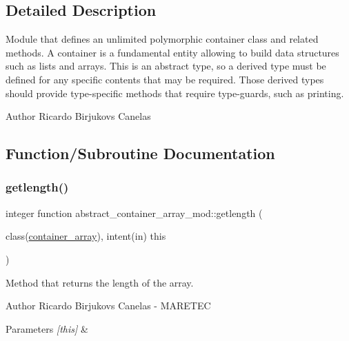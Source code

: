 \subsection{Detailed Description}
Module that defines an unlimited polymorphic container class and related methods. A container is a fundamental entity allowing to build data structures such as lists and arrays. This is an abstract type, so a derived type must be defined for any specific contents that may be required. Those derived types should provide type-\/specific methods that require type-\/guards, such as printing. 

\begin{DoxyAuthor}{Author}
Ricardo Birjukovs Canelas 
\end{DoxyAuthor}


\subsection{Function/\+Subroutine Documentation}
\mbox{\label{namespaceabstract__container__array__mod_a22d71ca3f03bf0bb5d3737338e5e349a}} 
\subsubsection{\texorpdfstring{getlength()}{getlength()}}
{\footnotesize\ttfamily integer function abstract\+\_\+container\+\_\+array\+\_\+mod\+::getlength (\begin{DoxyParamCaption}\item[{class(\mbox{\hyperlink{structabstract__container__array__mod_1_1container__array}{container\+\_\+array}}), intent(in)}]{this }\end{DoxyParamCaption})\hspace{0.3cm}{\ttfamily [private]}}



Method that returns the length of the array. 

\begin{DoxyAuthor}{Author}
Ricardo Birjukovs Canelas -\/ M\+A\+R\+E\+T\+EC 
\end{DoxyAuthor}

\begin{DoxyParams}{Parameters}
{\em \mbox{[}this\mbox{]}} & \\
\hline
\end{DoxyParams}


